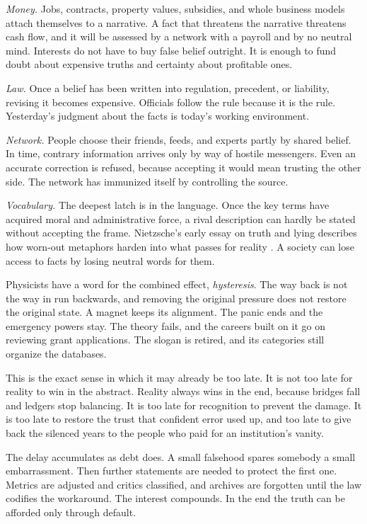 \documentclass[12pt,a4paper]{book}
\begin{document}
\emph{Money.} Jobs, contracts, property values, subsidies, and whole business models attach themselves to a narrative. A fact that threatens the narrative threatens cash flow, and it will be assessed by a network with a payroll and by no neutral mind. Interests do not have to buy false belief outright. It is enough to fund doubt about expensive truths and certainty about profitable ones.

\emph{Law.} Once a belief has been written into regulation, precedent, or liability, revising it becomes expensive. Officials follow the rule because it is the rule. Yesterday's judgment about the facts is today's working environment.

\emph{Network.} People choose their friends, feeds, and experts partly by shared belief. In time, contrary information arrives only by way of hostile messengers. Even an accurate correction is refused, because accepting it would mean trusting the other side. The network has immunized itself by controlling the source.

\emph{Vocabulary.} The deepest latch is in the language. Once the key terms have acquired moral and administrative force, a rival description can hardly be stated without accepting the frame. Nietzsche's early essay on truth and lying describes how worn-out metaphors harden into what passes for reality \cite{Nietzsche-WahrheitLuege}. A society can lose access to facts by losing neutral words for them.

Physicists have a word for the combined effect, \emph{hysteresis}. The way back is not the way in run backwards, and removing the original pressure does not restore the original state. A magnet keeps its alignment. The panic ends and the emergency powers stay. The theory fails, and the careers built on it go on reviewing grant applications. The slogan is retired, and its categories still organize the databases.

This is the exact sense in which it may already be too late. It is not too late for reality to win in the abstract. Reality always wins in the end, because bridges fall and ledgers stop balancing. It is too late for recognition to prevent the damage. It is too late to restore the trust that confident error used up, and too late to give back the silenced years to the people who paid for an institution's vanity.

The delay accumulates as debt does. A small falsehood spares somebody a small embarrassment. Then further statements are needed to protect the first one. Metrics are adjusted and critics classified, and archives are forgotten until the law codifies the workaround. The interest compounds. In the end the truth can be afforded only through default.
\end{document}
